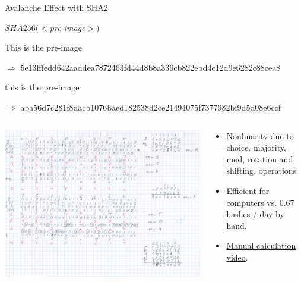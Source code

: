 \documentclass[handout]{beamer}
\begin{document}
\begin{frame}{Avalanche Effect with SHA2}

\begin{center}
$SHA256(<$\textit{pre-image}$>)$
\end{center}

This is the pre-image

$\Rightarrow$ \footnotesize 5e13fffedd642aaddea7872463fd44d8b8a336cb822ebd4c12d9e6282c88cea8 \normalsize
\vspace{1em}

\color{focus}t\color{black}his is the pre-image

$\Rightarrow$ \footnotesize \color{focus}aba56d7c281f8d\color{black}a\color{focus}cb1076baed182538d2ce21494075f7377982bf9d5d0\color{black}8\color{focus}e6ccf\color{black} \normalsize
\vspace{1em}

\begin{columns}[T]
	\begin{column}{0.35\textwidth}
		\includegraphics[width = 4 cm, frame]{../assets/images/manual_hashing_video.png}
	\end{column} %
	\begin{column}{0.65\textwidth}
		\begin{itemize}
			\item Nonlinarity due to choice, majority, mod, rotation and shifting. operations
			\item Efficient for computers vs. 0.67 hashes / day by hand.
			\item \link \href{https://www.youtube.com/watch?v=y3dqhixzGVo}{Manual calculation video}.
		\end{itemize}
	\end{column}
\end{columns}

	
\end{frame}
\end{document}
